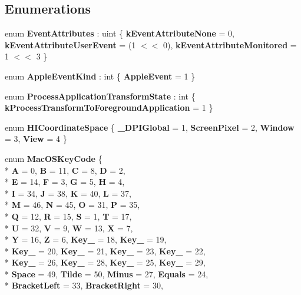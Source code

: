 \subsection*{Enumerations}
\begin{DoxyCompactItemize}
\item 
enum {\bfseries Event\-Attributes} \-: uint \{ {\bfseries k\-Event\-Attribute\-None} = 0, 
{\bfseries k\-Event\-Attribute\-User\-Event} = (1 $<$$<$ 0), 
{\bfseries k\-Event\-Attribute\-Monitored} = 1 $<$$<$ 3
 \}
\item 
enum {\bfseries Apple\-Event\-Kind} \-: int \{ {\bfseries Apple\-Event} = 1
 \}
\item 
enum {\bfseries Process\-Application\-Transform\-State} \-: int \{ {\bfseries k\-Process\-Transform\-To\-Foreground\-Application} = 1
 \}
\item 
enum {\bfseries H\-I\-Coordinate\-Space} \{ {\bfseries \-\_\-D\-P\-I\-Global} = 1, 
{\bfseries Screen\-Pixel} = 2, 
{\bfseries Window} = 3, 
{\bfseries View} = 4
 \}
\item 
enum {\bfseries Mac\-O\-S\-Key\-Code} \{ \\*
{\bfseries A} = 0, 
{\bfseries B} = 11, 
{\bfseries C} = 8, 
{\bfseries D} = 2, 
\\*
{\bfseries E} = 14, 
{\bfseries F} = 3, 
{\bfseries G} = 5, 
{\bfseries H} = 4, 
\\*
{\bfseries I} = 34, 
{\bfseries J} = 38, 
{\bfseries K} = 40, 
{\bfseries L} = 37, 
\\*
{\bfseries M} = 46, 
{\bfseries N} = 45, 
{\bfseries O} = 31, 
{\bfseries P} = 35, 
\\*
{\bfseries Q} = 12, 
{\bfseries R} = 15, 
{\bfseries S} = 1, 
{\bfseries T} = 17, 
\\*
{\bfseries U} = 32, 
{\bfseries V} = 9, 
{\bfseries W} = 13, 
{\bfseries X} = 7, 
\\*
{\bfseries Y} = 16, 
{\bfseries Z} = 6, 
{\bfseries Key\-\_} = 18, 
{\bfseries Key\-\_} = 19, 
\\*
{\bfseries Key\-\_} = 20, 
{\bfseries Key\-\_} = 21, 
{\bfseries Key\-\_} = 23, 
{\bfseries Key\-\_} = 22, 
\\*
{\bfseries Key\-\_} = 26, 
{\bfseries Key\-\_} = 28, 
{\bfseries Key\-\_} = 25, 
{\bfseries Key\-\_} = 29, 
\\*
{\bfseries Space} = 49, 
{\bfseries Tilde} = 50, 
{\bfseries Minus} = 27, 
{\bfseries Equals} = 24, 
\\*
{\bfseries Bracket\-Left} = 33, 
{\bfseries Bracket\-Right} = 30, 

\end{DoxyCompactItemize}
